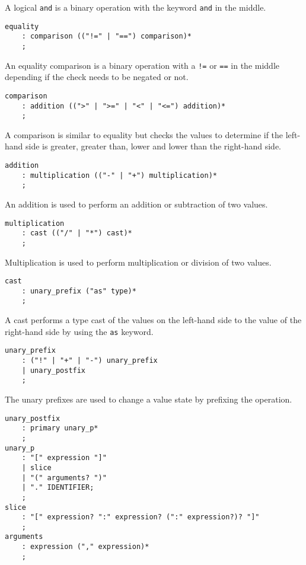 A logical \texttt{and} is a binary operation with the keyword \texttt{and} in the middle.

\begin{lstlisting}
equality
    : comparison (("!=" | "==") comparison)*
    ;
\end{lstlisting}

An equality comparison is a binary operation with a \texttt{!=} or \texttt{==} in the middle depending if the check needs to be negated or not.

\begin{lstlisting}
comparison
    : addition ((">" | ">=" | "<" | "<=") addition)*
    ;
\end{lstlisting}

A comparison is similar to equality but checks the values to determine if the left-hand side is greater, greater than, lower and lower than the
right-hand side.

\begin{lstlisting}
addition
    : multiplication (("-" | "+") multiplication)*
    ;
\end{lstlisting}

An addition is used to perform an addition or subtraction of two values.

\begin{lstlisting}
multiplication
    : cast (("/" | "*") cast)*
    ;
\end{lstlisting}

Multiplication is used to perform multiplication or division of two values.

\begin{lstlisting}
cast
    : unary_prefix ("as" type)*
    ;
\end{lstlisting}

A cast performs a type cast of the values on the left-hand side to the value of the right-hand side by using the \texttt{as} keyword.

\begin{lstlisting}
unary_prefix
    : ("!" | "+" | "-") unary_prefix
    | unary_postfix
    ;
\end{lstlisting}

The unary prefixes are used to change a value state by prefixing the operation.

\begin{lstlisting}
unary_postfix
    : primary unary_p*
    ;
unary_p
    : "[" expression "]"
    | slice
    | "(" arguments? ")"
    | "." IDENTIFIER;
    ;
slice
    : "[" expression? ":" expression? (":" expression?)? "]"
    ;
arguments
    : expression ("," expression)*
    ;
\end{lstlisting}


